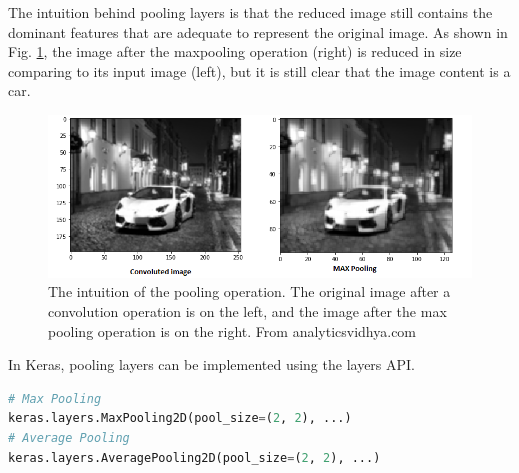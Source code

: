 The intuition behind pooling layers is that the reduced image still contains the dominant features that are adequate to represent the original image. As shown in Fig. \ref{fig_pooling_blurry}, the image after the maxpooling operation (right) is reduced in size comparing to its input image (left), but it is still clear that the image content is a car. 
\begin{figure}[h!]
\begin{center}
\includegraphics[width = 13cm]{img/pooling_blurry.png}
\caption{The intuition of the pooling operation. The original image after a convolution operation is on the left, and the image after the max pooling operation is on the right. From analyticsvidhya.com \label{fig_pooling_blurry}}
\end{center}
\end{figure}

In Keras, pooling layers can be implemented using the layers API.
\begin{lstlisting}[language=python,frame=single]
# Max Pooling
keras.layers.MaxPooling2D(pool_size=(2, 2), ...)
# Average Pooling
keras.layers.AveragePooling2D(pool_size=(2, 2), ...)
\end{lstlisting}

